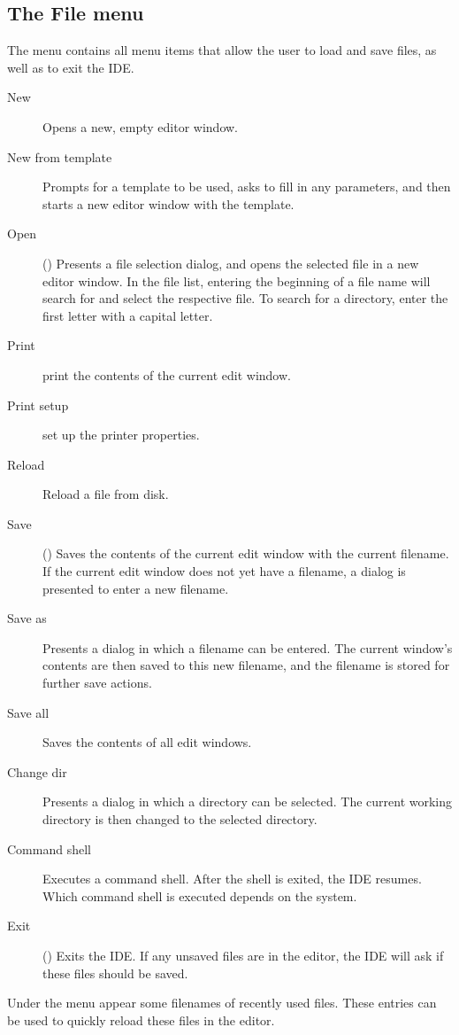 \subsection{The File menu}
\label{se:menufile}
The  menu contains all menu items that allow the user 
to load and save files, as well as to exit the IDE.
\begin{description}
\item[New] Opens a new, empty editor window.
\item[New from template] Prompts for a template to be used, asks to fill in
any parameters, and then starts a new editor window with the template.
\item[Open] () Presents a file selection dialog, and opens
the selected file in a new editor window. In the file list, entering the
beginning of a file name will search for and select the respective file. To
search for a directory, enter the first letter with a capital letter.
\item[Print] print the contents of the current edit window.
\item[Print setup] set up the printer properties.
\item[Reload] Reload a file from disk.
\item[Save] () Saves the contents of the current edit window
with the current filename. If the current edit window does not yet have
a filename, a dialog is presented to enter a new filename.
\item[Save as] Presents a dialog in which a filename can be entered. The
current window's contents are then saved to this new filename, and the
filename is stored for further save actions.
\item[Save all] Saves the contents of all edit windows.

\item[Change dir] Presents a dialog in which a directory can be selected.
The current working directory is then changed to the selected directory.
\item[Command shell] Executes a command shell. After the shell is exited, the
IDE resumes. Which command shell is executed depends on the system.
\item[Exit] () Exits the IDE. If any unsaved files are
in the editor, the IDE will ask if these files should be saved.
\end{description}
Under the  menu appear some filenames of recently used files.
These entries can be used to quickly reload these files in the editor.

